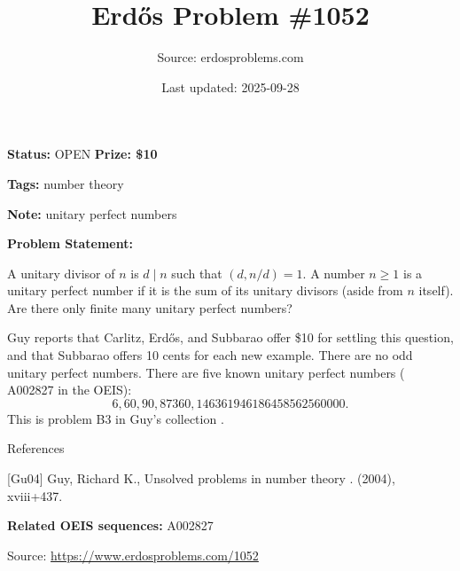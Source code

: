 \documentclass{article}
\title{Erd\H{o}s Problem \#1052}
\date{Last updated: 2025-09-28}
\author{Source: erdosproblems.com}
\begin{document}
\maketitle

\noindent\textbf{Status:} OPEN \quad \textbf{Prize: \$10}

\noindent\textbf{Tags:} number theory

\medskip
\noindent\textbf{Note:} unitary perfect numbers

\medskip

\noindent\textbf{Problem Statement:}

A unitary divisor of $n$ is $d\mid n$ such that $(d,n/d)=1$. A number $n\geq 1$ is a unitary perfect number if it is the sum of its unitary divisors (aside from $n$ itself). Are there only finite many unitary perfect numbers?




Guy \cite{Gu04} reports that Carlitz, Erd\H{o}s, and Subbarao offer \$10 for settling this question, and that Subbarao offers 10 cents for each new example. There are no odd unitary perfect numbers. There are five known unitary perfect numbers ( A002827 in the OEIS):\[6, 60, 90, 87360, 146361946186458562560000.\]This is problem B3 in Guy's collection \cite{Gu04}.




References

[Gu04] Guy, Richard K., Unsolved problems in number theory . (2004), xviii+437.

\noindent\textbf{Related OEIS sequences:} A002827


\bigskip
\noindent\small{Source: \url{https://www.erdosproblems.com/1052}}
\end{document}
